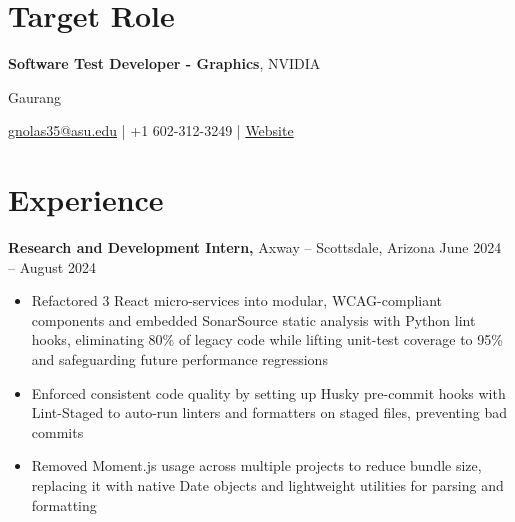 \documentclass[11pt]{article}       %
\begin{document}
\section*{Target Role}
\textbf{Software Test Developer - Graphics}, NVIDIA\\
\vspace{10pt}


\centerline{\Huge Gaurang}
\vspace{5pt}

\centerline{\href{mailto:gnolas35@asu.edu}{gnolas35@asu.edu} | +1 602-312-3249 
| \href{https://portfolio-sinedd777s-projects.vercel.app/}{Website}}
\vspace{-10pt}

\section*{Experience}
\textbf{Research and Development Intern,} {Axway} -- Scottsdale, Arizona \hfill June 2024 -- August 2024 \\
\vspace{-9pt}
\begin{itemize}
\item Refactored 3 React micro-services into modular, WCAG-compliant components and embedded SonarSource static analysis with Python lint hooks, eliminating 80\% of legacy code while lifting unit-test coverage to 95\% and safeguarding future performance regressions
\item Enforced consistent code quality by setting up Husky pre-commit hooks with Lint-Staged to auto-run linters and formatters on staged files, preventing bad commits
\item Removed Moment.js usage across multiple projects to reduce bundle size, replacing it with native Date objects and lightweight utilities for parsing and formatting
\end{itemize}
\vspace{10pt}
\end{document}
